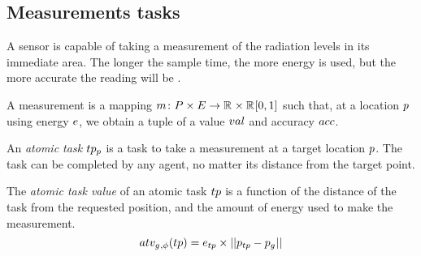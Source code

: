 
\newcommand{\varMeasurementValue}[2]{\varSymbol{val}{#1}{#2}}
\newcommand{\varMeasurementAccuracy}[2]{\varSymbol{acc}{#1}{#2}}
\newcommand{\varLocation}[2]{\varSymbol{p}{#1}{#2}}
\newcommand{\setLocation}[2]{\setSymbol{P}{#1}{#2}}
\newcommand{\varEnergy}[2]{\varSymbol{e}{#1}{#2}}
\newcommand{\setEnergy}[2]{\setSymbol{E}{#1}{#2}}
\newcommand{\formalMeasurement}[2]{
	\functionFormal{m}
	{\setLocation{}{} \times \setEnergy{}{}}
	{\setRealNumbers{}{} \times \setRealNumbersUnit{}{}}
}

\subsection{Measurements tasks}
A sensor is capable of taking a measurement of the radiation levels in its immediate area. The longer the sample time, the more energy is used, but the more accurate the reading will be \citep{dummy}.
\begin{definition}[Measurement]
	A measurement is a mapping $\formalMeasurement{}{}$ such that, at a location $\varLocation{}{}$ using energy $\varEnergy{}{}$, we obtain a tuple of a value $\varMeasurementValue{}{}$ and accuracy $\varMeasurementAccuracy{}{}$.
\end{definition}


\begin{definition}
	An \textit{atomic task} $\varAtomicTask{\varLocation{}{}}{}$ is a task to take a measurement at a target location $\varLocation{}{}$. The task can be completed by any agent, no matter its distance from the target point.
\end{definition}

\newcommand{\functionAtomicTaskQualitySignature}[2]{
	\functionSignature{atv_{\varAgent{}{}, \varTime{}{}}} {\varAtomicTask{}{}}
}
\begin{definition}
	The \textit{atomic task value} of an atomic task $\varAtomicTask{}{}$ is a function of the distance of the task from the requested position, and the amount of energy used to make the measurement.
	\begin{equation}
		\functionAtomicTaskQualitySignature{}{} = \varEnergy{\varAtomicTask{}{}}{} \times \funcSize{\funcSize{\varLocation{\varAtomicTask{}{}}{} - \varLocation{\varAgent{}{}}{}}{}}{}
	\end{equation}
\end{definition}

